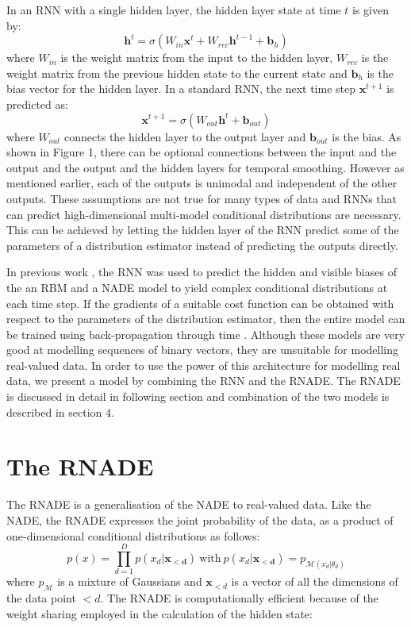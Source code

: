 \documentclass{article} %
\begin{document}
In an RNN with a single hidden layer, the hidden layer state at time $t$ is given by:
$$ \mathbf{h}^t = \sigma{(W_{in}\mathbf{x}^t + W_{rec}\mathbf{h}^{t-1} + \mathbf{b}_h)}$$
where $W_{in}$ is the weight matrix from the input to the hidden layer, $W_{rec}$ is the weight matrix from the previous hidden state to the current state and $\mathbf{b}_h$ is the bias vector for the hidden layer. In a standard RNN, the next time step $\mathbf{x}^{t+1}$ is predicted as:
$$ \mathbf{x}^{t+1} = \sigma{(W_{out}\mathbf{h}^{t} + \mathbf{b}_{out})}$$  
where $W_{out}$ connects the hidden layer to the output layer and $\mathbf{b}_{out}$ is the bias. As shown in Figure 1, there can be optional connections between the input and the output and the output and the hidden layers for temporal smoothing. However as mentioned earlier, each of the outputs is unimodal and independent of the other outputs. These assumptions are not true for many types of data and RNNs that can predict high-dimensional multi-model conditional distributions are necessary. This can be achieved by letting the hidden layer of the RNN predict some of the parameters of a distribution estimator instead of predicting the outputs directly. 

In previous work \cite{Boulanger-Lewandowski2012}, the RNN was used to predict the hidden and visible biases of the an RBM and a NADE model to yield complex conditional distributions at each time step. If the gradients of a suitable cost function can be obtained with respect to the parameters of the distribution estimator, then the entire model can be trained using back-propagation through time \cite{rumelhart1985learning}. Although these models are very good at modelling sequences of binary vectors, they are unsuitable for modelling real-valued data. In order to use the power of this architecture for modelling real data, we present a model by combining the RNN and the RNADE. The RNADE is discussed in detail in following section and combination of the two models is described in section 4. 

\section{The RNADE}
\label{RNADE}

The RNADE is a generalisation of the NADE to real-valued data. Like the NADE, the RNADE expresses the joint probability of the data, as a product of one-dimensional conditional distributions as follows:
$$ p(x) = \prod_{d=1}^{D} p(x_d|\mathbf{x_{<d}}) \: \text{with} \: p(x_d|\mathbf{x_{<d}}) = p_{\mathcal{M}(x_d|\theta_d)} $$ where $p_{\mathcal{M}}$ is a mixture of Gaussians and $\boldsymbol{x}_{<d}$ is a vector of all the dimensions of the data point $<d$. The RNADE is computationally efficient because of the weight sharing employed in the calculation of the hidden state: %
\end{document}
